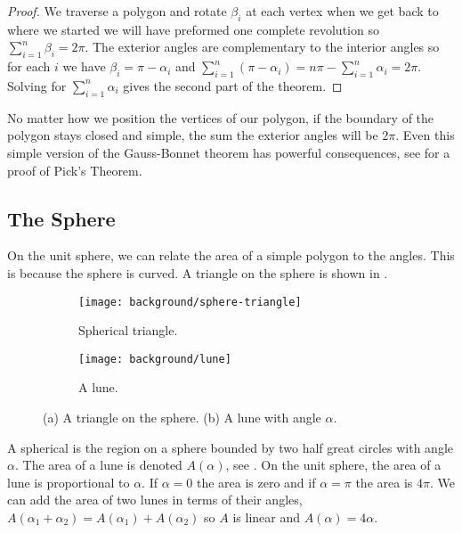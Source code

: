 \begin{proof}

	We traverse a polygon and rotate $\beta_i$ at each vertex
	when we get back to where we started we will have preformed 
	one complete revolution so $\sum_{i=1}^n\beta_i=2\pi.$
	The exterior angles are complementary to the interior angles
	so for each $i$ we have $\beta_i=\pi-\alpha_i$  and
	$\sum_{i=1}^n(\pi-\alpha_i)=n\pi -\sum_{i=1}^n\alpha_i=2\pi$. 
	Solving for $\sum_{i=1}^n\alpha_i$ gives the second part of the theorem.

\end{proof}


No matter how we position the vertices of our polygon,
if the boundary of the polygon stays closed and simple,
the sum the exterior angles will be $2\pi$.
Even this simple version of the Gauss-Bonnet theorem has powerful
consequences, see  for a proof of Pick's Theorem.




\subsection{The Sphere}
On the unit sphere, we can relate the area of a simple polygon 
to the angles. This is because the sphere is curved.
A triangle on the sphere is shown in .


 \begin{figure}[htb]
         \centering
        \begin{subfigure}[b]{0.35\textwidth}
         \texttt{[image: background/sphere-triangle]}
         \caption{Spherical triangle.}
 	 \label{fig:sphere-triangle}
       \end{subfigure}
         \hspace{1cm}
         \begin{subfigure}[b]{0.35\textwidth}
         \texttt{[image: background/lune]}
         \caption{A lune.}
          \label{fig:lune}
         \end{subfigure}
		\caption{(a) A triangle on the sphere.
 		(b) A lune with angle $\alpha$.
 		\label{fig:sphere-lune}}
 \end{figure}
A spherical  is the region on a sphere bounded by two half great circles
with angle $\alpha$. The area of a lune is denoted $A(\alpha)$,
 see .
On the unit sphere, the area of a lune is proportional to $\alpha$. 
If $\alpha=0$ the area is zero and if $\alpha=\pi$ the area is $4\pi$.
We can add the area of two lunes in terms of their angles, 
$A(\alpha_1+\alpha_2)=A(\alpha_1)+A(\alpha_2)$ so $A$ is linear
and  $A(\alpha)=4\alpha.$




